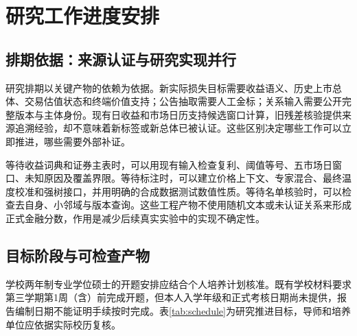 \chapter{研究工作进度安排}
\section{排期依据：来源认证与研究实现并行}
研究排期以关键产物的依赖为依据。新实际损失目标需要收益语义、历史上市总体、交易估值状态和终端价值支持；公告抽取需要人工金标；关系输入需要公开完整版本与主体身份。现有日收益和市场日历支持候选窗口计算，旧残差核验提供来源追溯经验，却不意味着新标签或新总体已被认证。这些区别决定哪些工作可以立即推进，哪些需要外部补证。


等待收益词典和证券主表时，可以用现有输入检查复利、阈值等号、五市场日窗口、未知原因及覆盖界限。等待标注时，可以建立价格上下文、专家混合、最终温度校准和强树接口，并用明确的合成数据测试数值性质。等待名单核验时，可以检查去自身、小邻域与版本查询。这些工程产物不使用随机文本或未认证关系来形成正式金融分数，作用是减少后续真实实验中的实现不确定性。

\section{目标阶段与可检查产物}
学校两年制专业学位硕士的开题安排应结合个人培养计划核准。既有学校材料要求第三学期第1周（含）前完成开题，但本人入学年级和正式考核日期尚未提供，报告编制日期不能证明手续按时完成。表\ref{tab:schedule}为研究推进目标，导师和培养单位应依据实际校历复核。


